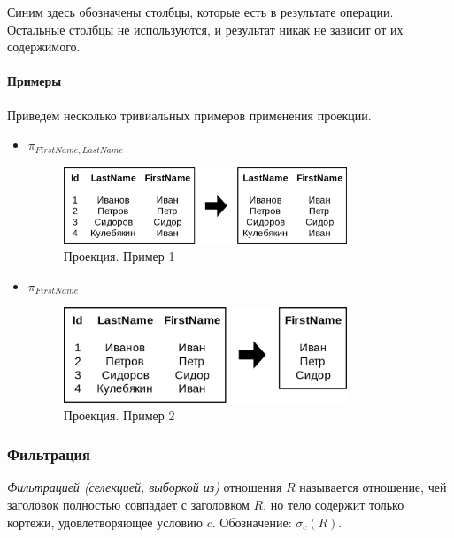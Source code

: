 Синим здесь обозначены столбцы, которые есть в результате операции. Остальные столбцы не
используются, и результат никак не зависит от их содержимого.

\paragraph{Примеры}
Приведем несколько тривиальных примеров применения проекции.

\begin{itemize}
	\item $\pi_{FirstName, LastName}$
	      \begin{figure}[H]
		      \centering
		      \includegraphics[width=0.8\textwidth]{../assets/kgeorgiy/relalgebra/Primitive_Projection_2.svg.png}
		      \caption{Проекция. Пример 1}
		      \label{proj-ex-1}
	      \end{figure}
	\item $\pi_{FirstName}$
	      \begin{figure}[H]
		      \centering
		      \includegraphics[width=0.8\textwidth]{../assets/kgeorgiy/relalgebra/Primitive_Projection_3.svg.png}
		      \caption{Проекция. Пример 2}
		      \label{proj-ex-2}
	      \end{figure}
\end{itemize}

\subsubsection{Фильтрация}

\begin{definition}
	\textit{Фильтрацией (селекцией, выборкой из)} отношения $R$ называется отношение,
	чей заголовок полностью совпадает с заголовком $R$, но тело содержит только
	кортежи, удовлетворяющее условию $c$. Обозначение: $\sigma_c(R)$.
\end{definition}

